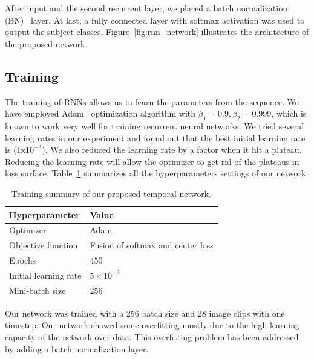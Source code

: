 After input and the second recurrent layer, we placed a batch normalization (BN)~\cite{Ioffe_15} layer. At last, a fully connected layer with softmax activation was used to output the subject classes. Figure~\ref{fig:rnn_network} illustrates the architecture of the proposed network. 


\subsection{Training}
The training of RNNs allows us to learn the parameters from the sequence. We have employed Adam~\cite{Kingma_15} optimization algorithm with $\beta_1 = 0.9, \beta_2 = 0.999$, which is known to work very well for training recurrent neural networks. We tried several learning rates in our experiment and found out that the best initial learning rate is $(1$x$10^{-3})$. We also reduced the learning rate by a factor when it hit a plateau. Reducing the learning rate will allow the optimizer to get rid of the plateaus in loss surface. Table~\ref{table:summary_tn} summarizes all the hyperparameters settings of our network.

\begin{table}
	\centering
	\caption{Training summary of our proposed temporal network. \label{table:summary_tn}}
	\begin{tabular*}{32pc}{@{\extracolsep{\fill}}ll@{}}
			\hline \noalign{\vspace{3pt}}
			\textbf{Hyperparameter} &\qquad \textbf{Value} \\ [3pt] \hline\noalign{\vspace{3pt}}
			Optimizer     			&\qquad Adam~\cite{Kingma_15} \\[3pt]
			Objective function  	&\qquad Fusion of softmax and center loss \\[3pt]
			Epochs        			&\qquad $ 450 $ \\ [3pt]
			Initial learning rate	&\qquad $5 \times 10^{-3}$  \\[3pt]
			Mini-batch size			&\qquad $ 256 $ \\
			\hline
	\end{tabular*}
\end{table}

Our network was trained with a 256 batch size and 28 image clips with one timestep. Our network showed some overfitting mostly due to the high learning capacity of the network over data. This overfitting problem has been addressed by adding a batch normalization layer. 

